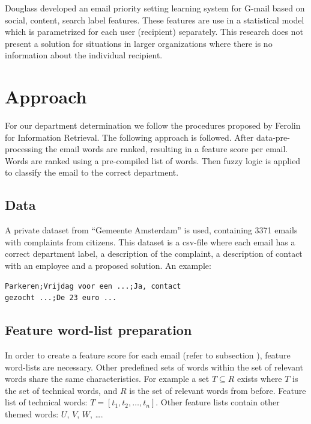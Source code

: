 \documentclass[journal]{IEEEtran}
\begin{document}
Douglass \cite{ranking} developed an email priority setting learning system for G-mail based on social, content, search label features. These features are use in a statistical model which is parametrized for each user (recipient) separately. This research does not present a solution for situations in larger organizations where there is no information about the individual recipient.

\section{Approach}
For our department determination we follow the procedures proposed by Ferolin for Information Retrieval. The following approach is followed. After data-pre-processing the email words are ranked, resulting in a feature score per email. Words are ranked using a pre-compiled list of words. Then fuzzy logic is applied to classify the email to the correct department.

\subsection{Data}

A private dataset from ``Gemeente Amsterdam'' is used, containing 3371 emails with complaints from citizens.
This dataset is a csv-file where each email has a correct department label, a description of the complaint, a description of contact with an employee and a proposed solution.
An example:
\begin{lstlisting}
Parkeren;Vrijdag voor een ...;Ja, contact
gezocht ...;De 23 euro ...
\end{lstlisting}

\subsection{Feature word-list preparation}

In order to create a feature score for each email (refer to subsection ), feature word-lists are necessary. Other predefined sets of words within the set of relevant words share the same characteristics. For example a set $T \subseteq R$ exists where $T$
is the set of technical words, and $R$ is the set of relevant words from before. Feature list of technical words: $T = [t_1, t_2, \dots, t_n]$.
Other feature lists contain other themed words: $U$, $V$, $W$, \dots .
\end{document}
